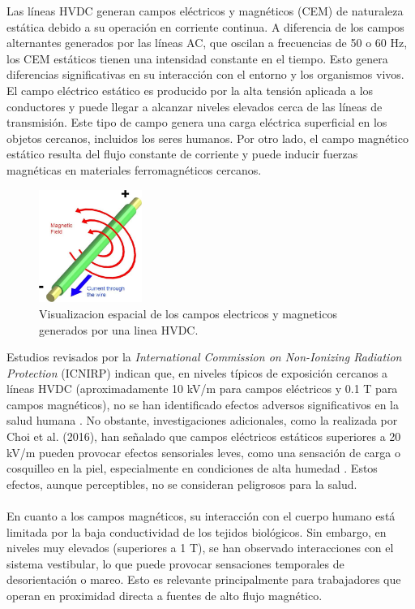 Las líneas HVDC generan campos eléctricos y magnéticos (CEM) de naturaleza estática debido a su operación en corriente continua. A diferencia de los campos alternantes generados por las líneas AC, que oscilan a frecuencias de 50 o 60 Hz, los CEM estáticos tienen una intensidad constante en el tiempo. Esto genera diferencias significativas en su interacción con el entorno y los organismos vivos.\\

El campo eléctrico estático es producido por la alta tensión aplicada a los conductores y puede llegar a alcanzar niveles elevados cerca de las líneas de transmisión. Este tipo de campo genera una carga eléctrica superficial en los objetos cercanos, incluidos los seres humanos. Por otro lado, el campo magnético estático resulta del flujo constante de corriente y puede inducir fuerzas magnéticas en materiales ferromagnéticos cercanos.\\
\begin{figure}
	\centering
	\includegraphics[width=0.3\textwidth]{img/ejemplos/Figure_8}
	\caption{Visualizacion espacial de los campos electricos y magneticos generados por una linea HVDC.}
	\label{fig:figure_8}
\end{figure}
Estudios revisados por la \textit{International Commission on Non-Ionizing Radiation Protection} (ICNIRP) indican que, en niveles típicos de exposición cercanos a líneas HVDC (aproximadamente 10 kV/m para campos eléctricos y 0.1 T para campos magnéticos), no se han identificado efectos adversos significativos en la salud humana \cite{ICNIRP2020Guidelines}. No obstante, investigaciones adicionales, como la realizada por Choi et al. (2016), han señalado que campos eléctricos estáticos superiores a 20 kV/m pueden provocar efectos sensoriales leves, como una sensación de carga o cosquilleo en la piel, especialmente en condiciones de alta humedad \cite{Choi2016StaticFields}. Estos efectos, aunque perceptibles, no se consideran peligrosos para la salud.\\\\
En cuanto a los campos magnéticos, su interacción con el cuerpo humano está limitada por la baja conductividad de los tejidos biológicos. Sin embargo, en niveles muy elevados (superiores a 1 T), se han observado interacciones con el sistema vestibular, lo que puede provocar sensaciones temporales de desorientación o mareo. Esto es relevante principalmente para trabajadores que operan en proximidad directa a fuentes de alto flujo magnético.

